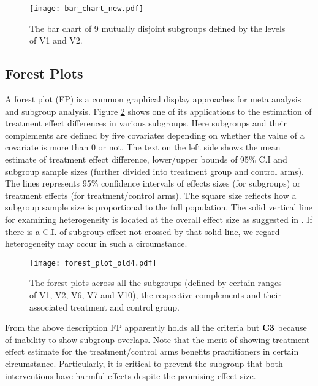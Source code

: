 \documentclass[Afour,sagev,times, doublespace]{sagej}
\begin{document}
{\begin{figure}
\begin{center}
	\texttt{[image: bar\_chart\_new.pdf]} \\
		\caption{The bar chart of 9 mutually disjoint subgroups defined by the levels of V1 and V2.}\label{fig:BC}
\end{center}
\end{figure}


\subsection{Forest Plots}

A forest plot (FP) is a common graphical display approaches for meta analysis and subgroup analysis. Figure \ref{fig:oldFP} shows one of its applications to the estimation of treatment effect differences in various subgroups. Here subgroups and their complements are defined by five covariates depending on whether the value of a covariate is more than 0 or not. The text on the left side shows the mean estimate of treatment effect difference, lower/upper bounds of 95$\%$ C.I and subgroup sample sizes (further divided into treatment group and control arms). The lines represents 95$\%$ confidence intervals of effects sizes (for subgroups) or treatment effects (for treatment/control arms). The square size reflects how a subgroup sample size is proportional to the full population. The solid vertical line for examining heterogeneity is located at the overall effect size as suggested in \cite{Cuzick:05}. If there is a C.I. of subgroup effect not crossed by that solid line, we regard heterogeneity may occur in such a circumstance.

\begin{figure}
\begin{center}
		\texttt{[image: forest\_plot\_old4.pdf]} \\
		\caption{The forest plots across all the subgroups (defined by certain ranges of  V1, V2, V6, V7 and V10), the respective complements and their associated treatment and control group. }\label{fig:oldFP}
\end{center}
\end{figure}

From the above description FP apparently holds all the criteria but $\bf C3$ because of inability to show subgroup overlaps. Note that the merit of showing treatment effect estimate for the treatment/control arms benefits practitioners in certain circumstance. Particularly, it is critical to prevent the subgroup that both interventions have harmful effects despite the promising effect size.

}
\end{document}
